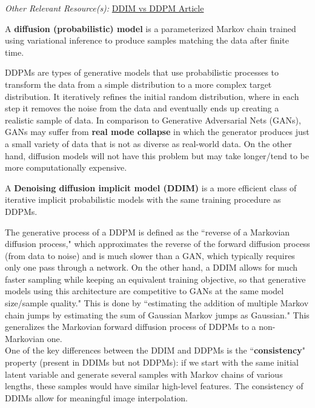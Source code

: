 \documentclass[12pt]{amsart}
\begin{document}
\textit{Other Relevant Resource(s):} \href{https://strikingloo.github.io/wiki/ddim#:~:text=Properties%20of%20DDIM%20vs%20DDPM,have%20similar%20high%2Dlevel%20features}{DDIM vs DDPM Article}

\begin{definition}
A \textbf{diffusion (probabilistic) model} is a parameterized Markov chain trained using variational inference to produce samples matching the data after finite time.  
\end{definition}

DDPMs are types of generative models that use probabilistic processes to transform the data from a simple distribution to a more complex target distribution. It iteratively refines the initial random distribution, where in each step it removes the noise from the data and eventually ends up creating a realistic sample of data. In comparison to Generative Adversarial Nets (GANs), GANs may suffer from \textbf{real mode collapse} in which the generator produces just a small variety of data that is not as diverse as real-world data. On the other hand, diffusion models will not have this problem but may take longer/tend to be more computationally expensive. \\

\begin{definition}[DDIM]
A \textbf{Denoising diffusion implicit model (DDIM)} is a more efficient class of iterative implicit probabilistic models with the same training procedure as DDPMs.
\end{definition}

The generative process of a DDPM is defined as the ``reverse of a Markovian diffusion process," which approximates the reverse of the forward diffusion process (from data to noise) and is much slower than a GAN, which typically requires only one pass through a network. On the other hand, a DDIM allows for much faster sampling while keeping an equivalent training objective, so that generative models using this architecture are competitive to GANs at the same model size/sample quality." This is done by ``estimating the addition of multiple Markov chain jumps by estimating the sum of Gaussian Markov jumps as Gaussian." This generalizes the Markovian forward diffusion process of DDPMs to a non-Markovian one. \\

One of the key differences between the DDIM and DDPMs is the ``\textbf{consistency}" property (present in DDIMs but not DDPMs): if we start with the same initial latent variable and generate several samples with Markov chains of various lengths, these samples would have similar high-level features. The consistency of DDIMs allow for meaningful image interpolation.
\end{document}
